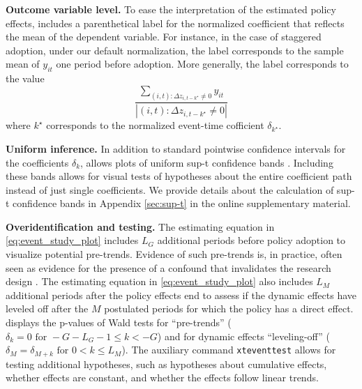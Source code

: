 \documentclass[12pt]{article}
\begin{document}
\noindent \textbf{Outcome variable level.}
To ease the interpretation of the estimated policy effects, \xtevent includes a parenthetical label for the normalized coefficient that reflects the mean of the dependent variable.
For instance, in the case of staggered adoption, under our default normalization, the label corresponds to the sample mean of $y_{it}$ one period before adoption.
More generally, the label corresponds to the value $$\frac{\sum_{(i,t): \Delta z_{i,t-k^{\star}} \neq 0} y_{it}}{ \left| (i,t) : \Delta z_{i,t-k^{\star}} \neq 0 \right| }$$ where $k^{\star}$ corresponds to the normalized event-time cofficient $\delta_{k^{\star}}$.

\begin{sloppypar}
	\noindent \textbf{Uniform inference.}
	In addition to standard pointwise confidence intervals for the coefficients $\delta_k$, \xtevent allows plots of uniform sup-t confidence bands \citep{freyberger2018uniform,montiel2019simultaneous}.
	Including these bands allows for visual tests of hypotheses about the entire coefficient path instead of just single coefficients. We provide details about the calculation of sup-t confidence bands in Appendix \ref{sec:sup-t} in the online supplementary material.
\end{sloppypar}

\noindent \textbf{Overidentification and testing.}
\label{newcite_pretrends2}
The estimating equation in \eqref{eq:event_study_plot} includes $L_G$ additional periods before policy adoption to visualize potential pre-trends.
Evidence of such pre-trends is, in practice, often seen as evidence for the presence of a confound that invalidates the research design \citep{freyaldenhoven2019pre}.
The estimating equation in \eqref{eq:event_study_plot} also includes $L_M$ additional periods after the policy effects end to assess if the dynamic effects have leveled off after the $M$ postulated periods for which the policy has a direct effect.
\xtevent displays the p-values of Wald tests for ``pre-trends'' ($\delta_k = 0 \text{ for } -G - L_G - 1 \leq k < -G$) and for dynamic effects ``leveling-off'' ($ \delta_M =\delta_{M+k} \text{ for } 0 < k \leq L_M$).
The auxiliary command \texttt{xteventtest} allows for testing additional hypotheses, such as hypotheses about cumulative effects, whether effects are constant, and whether the effects follow linear trends.
\end{document}
